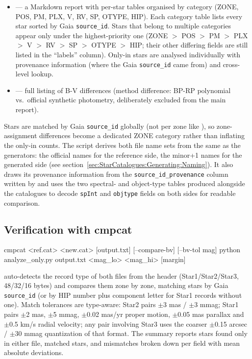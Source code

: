 \begin{itemize}
  \item {} --- a Markdown report with
        per-star tables organised by category (ZONE, POS, PM, PLX, V, RV,
        SP, OTYPE, HIP). Each category table lists every star sorted by
        Gaia \texttt{source\_id}. Stars that belong to multiple categories
        appear only under the highest-priority one (ZONE $>$ POS $>$ PM
        $>$ PLX $>$ V $>$ RV $>$ SP $>$ OTYPE $>$ HIP; their other
        differing fields are still listed in the ``labels'' column).
        Only-in stars are analysed individually with provenance
        information (where the Gaia \texttt{source\_id} came from) and
        cross-level lookup.
  \item {} --- full listing of B-V differences
        (method difference: BP-RP polynomial vs.\ official synthetic
        photometry, deliberately excluded from the main report).
\end{itemize}

Stars are matched by Gaia \texttt{source\_id} globally (not per zone
like ), so zone-assignment differences become a
dedicated ZONE category rather than inflating the only-in counts. The
script derives both file name sets from the same
 as the generators: the official names for the
reference side, the minor+1 names for the generated side (see
section~\ref{sec:StarCatalogues:Generating:Naming}). It also draws its
provenance information from the \texttt{source\_id\_provenance} column
written by  and uses the two spectral-
and object-type tables produced alongside the catalogues to decode
\texttt{spInt} and \texttt{objtype} fields on both sides for readable
comparison.

\subsection{Verification with cmpcat}
\label{sec:StarCatalogues:Generating:cmpcat}

\begin{commands}
cmpcat <ref.cat> <new.cat> [output.txt]
        [--compare-bv] [--bv-tol mag]
python analyze_only.py output.txt <mag_lo>
        <mag_hi> [margin]
\end{commands}

 auto-detects the record type of both files from the header
(Star1/Star2/Star3, 48/32/16 bytes) and compares them zone by zone, matching
stars by Gaia \texttt{source\_id} (or by HIP number plus component letter
for Star1 records without one). Match tolerances are type-aware:
Star2 pairs $\pm$3 mas / $\pm$3 mmag; Star1 pairs $\pm$2 mas, $\pm$5 mmag,
$\pm$0.02 mas/yr proper motion, $\pm$0.05 mas parallax and
$\pm$0.5 km/s radial velocity; any pair involving Star3 uses the coarser
$\pm$0.15 arcsec / $\pm$30 mmag quantization of that format. The summary
reports stars found only in either file, matched stars, and mismatches
broken down per field with mean absolute deviations.

